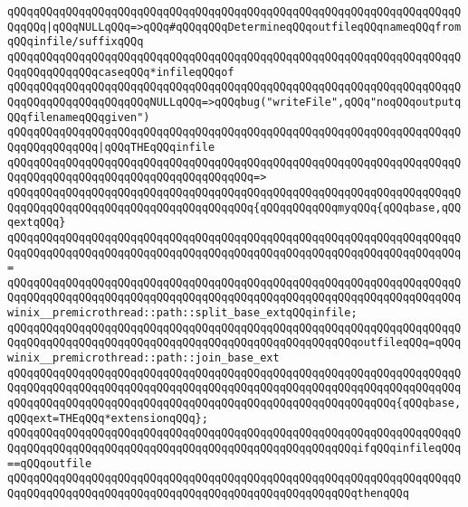 \newline
\verb|qQQqqQQqqQQqqQQqqQQqqQQqqQQqqQQqqQQqqQQqqQQqqQQqqQQqqQQqqQQqqQQqqQQqqQQqqQQq|\verb#|qQQqNULLqQQq=>qQQq#\verb|#qQQqqQQqDetermineqQQqoutfileqQQqnameqQQqfromqQQqinfile/suffixqQQq|\newline
\verb|qQQqqQQqqQQqqQQqqQQqqQQqqQQqqQQqqQQqqQQqqQQqqQQqqQQqqQQqqQQqqQQqqQQqqQQqqQQqqQQqqQQqcaseqQQq*infileqQQqof|\newline
\verb|qQQqqQQqqQQqqQQqqQQqqQQqqQQqqQQqqQQqqQQqqQQqqQQqqQQqqQQqqQQqqQQqqQQqqQQqqQQqqQQqqQQqqQQqqQQqNULLqQQq=>qQQqbug("writeFile",qQQq"noqQQqoutputqQQqfilenameqQQqgiven")|\newline
\newline
\verb|qQQqqQQqqQQqqQQqqQQqqQQqqQQqqQQqqQQqqQQqqQQqqQQqqQQqqQQqqQQqqQQqqQQqqQQqqQQqqQQqqQQq|\verb#|qQQqTHEqQQqinfile#\newline
\verb|qQQqqQQqqQQqqQQqqQQqqQQqqQQqqQQqqQQqqQQqqQQqqQQqqQQqqQQqqQQqqQQqqQQqqQQqqQQqqQQqqQQqqQQqqQQqqQQqqQQqqQQqqQQq=>|\newline
\verb|qQQqqQQqqQQqqQQqqQQqqQQqqQQqqQQqqQQqqQQqqQQqqQQqqQQqqQQqqQQqqQQqqQQqqQQqqQQqqQQqqQQqqQQqqQQqqQQqqQQqqQQqqQQq{qQQqqQQqqQQqmyqQQq{qQQqbase,qQQqextqQQq}|\newline
\verb|qQQqqQQqqQQqqQQqqQQqqQQqqQQqqQQqqQQqqQQqqQQqqQQqqQQqqQQqqQQqqQQqqQQqqQQqqQQqqQQqqQQqqQQqqQQqqQQqqQQqqQQqqQQqqQQqqQQqqQQqqQQqqQQqqQQqqQQqqQQq=|\newline
\verb|qQQqqQQqqQQqqQQqqQQqqQQqqQQqqQQqqQQqqQQqqQQqqQQqqQQqqQQqqQQqqQQqqQQqqQQqqQQqqQQqqQQqqQQqqQQqqQQqqQQqqQQqqQQqqQQqqQQqqQQqqQQqqQQqqQQqqQQqqQQqwinix__premicrothread::path::split_base_extqQQqinfile;|\newline
\newline
\verb|qQQqqQQqqQQqqQQqqQQqqQQqqQQqqQQqqQQqqQQqqQQqqQQqqQQqqQQqqQQqqQQqqQQqqQQqqQQqqQQqqQQqqQQqqQQqqQQqqQQqqQQqqQQqqQQqqQQqqQQqqQQqoutfileqQQq=qQQqwinix__premicrothread::path::join_base_ext|\newline
\verb|qQQqqQQqqQQqqQQqqQQqqQQqqQQqqQQqqQQqqQQqqQQqqQQqqQQqqQQqqQQqqQQqqQQqqQQqqQQqqQQqqQQqqQQqqQQqqQQqqQQqqQQqqQQqqQQqqQQqqQQqqQQqqQQqqQQqqQQqqQQqqQQqqQQqqQQqqQQqqQQqqQQqqQQqqQQqqQQqqQQqqQQqqQQqqQQqqQQqqQQq{qQQqbase,qQQqext=THEqQQq*extensionqQQq};|\newline
\newline
\verb|qQQqqQQqqQQqqQQqqQQqqQQqqQQqqQQqqQQqqQQqqQQqqQQqqQQqqQQqqQQqqQQqqQQqqQQqqQQqqQQqqQQqqQQqqQQqqQQqqQQqqQQqqQQqqQQqqQQqqQQqqQQqifqQQqinfileqQQq==qQQqoutfile|\newline
\verb|qQQqqQQqqQQqqQQqqQQqqQQqqQQqqQQqqQQqqQQqqQQqqQQqqQQqqQQqqQQqqQQqqQQqqQQqqQQqqQQqqQQqqQQqqQQqqQQqqQQqqQQqqQQqqQQqqQQqqQQqqQQqthenqQQq|\newline
